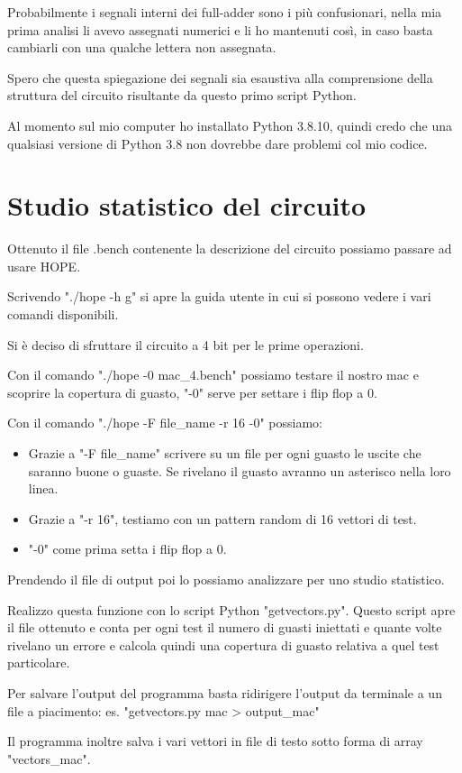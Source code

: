 \documentclass[12pt, letterpaper]{article}
\begin{document}
Probabilmente i segnali interni dei full-adder sono i più confusionari, nella mia prima analisi li avevo assegnati numerici e li ho mantenuti così, in caso basta cambiarli con una qualche lettera non assegnata.

Spero che questa spiegazione dei segnali sia esaustiva alla comprensione della struttura del circuito risultante da questo primo script Python.

Al momento sul mio computer ho installato Python 3.8.10, quindi credo che una qualsiasi versione di Python 3.8 non dovrebbe dare problemi col mio codice.

\section{Studio statistico del circuito}

Ottenuto il file .bench contenente la descrizione del circuito possiamo passare ad usare HOPE.

Scrivendo "./hope -h g" si apre la guida utente in cui si possono vedere i vari comandi disponibili.

Si è deciso di sfruttare il circuito a 4 bit per le prime operazioni.

Con il comando "./hope -0 mac\_4.bench" possiamo testare il nostro mac e scoprire la copertura di guasto, "-0" serve per settare i flip flop a 0.

Con il comando "./hope -F {file\_name} -r 16 -0" possiamo:

\begin{itemize}
\item Grazie a "-F {file\_name}" scrivere su un file per ogni guasto le uscite che saranno buone o guaste. Se rivelano il guasto avranno un asterisco nella loro linea.
\item Grazie a "-r 16", testiamo con un pattern random di 16 vettori di test.
\item "-0" come prima setta i flip flop a 0.
\end{itemize}

Prendendo il file di output poi lo possiamo analizzare per uno studio statistico.

Realizzo questa funzione con lo script Python "getvectors.py".
Questo script apre il file ottenuto e conta per ogni test il numero di guasti iniettati e quante volte rivelano un errore e calcola quindi una copertura di guasto relativa a quel test particolare.

Per salvare l'output del programma basta ridirigere l'output da terminale a un file a piacimento: es. "getvectors.py mac > output\_mac"

Il programma inoltre salva i vari vettori in file di testo sotto forma di array "vectors\_mac".
\end{document}
